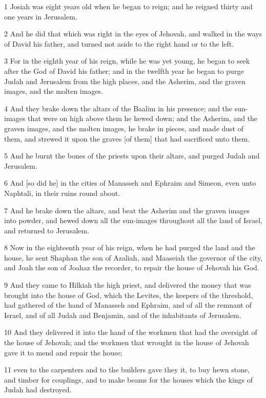 \par 1 Josiah was eight years old when he began to reign; and he reigned thirty and one years in Jerusalem.
\par 2 And he did that which was right in the eyes of Jehovah, and walked in the ways of David his father, and turned not aside to the right hand or to the left.
\par 3 For in the eighth year of his reign, while he was yet young, he began to seek after the God of David his father; and in the twelfth year he began to purge Judah and Jerusalem from the high places, and the Asherim, and the graven images, and the molten images.
\par 4 And they brake down the altars of the Baalim in his presence; and the sun-images that were on high above them he hewed down; and the Asherim, and the graven images, and the molten images, he brake in pieces, and made dust of them, and strewed it upon the graves [of them] that had sacrificed unto them.
\par 5 And he burnt the bones of the priests upon their altars, and purged Judah and Jerusalem.
\par 6 And [so did he] in the cities of Manasseh and Ephraim and Simeon, even unto Naphtali, in their ruins round about.
\par 7 And he brake down the altars, and beat the Asherim and the graven images into powder, and hewed down all the sun-images throughout all the land of Israel, and returned to Jerusalem.
\par 8 Now in the eighteenth year of his reign, when he had purged the land and the house, he sent Shaphan the son of Azaliah, and Maaseiah the governor of the city, and Joah the son of Joahaz the recorder, to repair the house of Jehovah his God.
\par 9 And they came to Hilkiah the high priest, and delivered the money that was brought into the house of God, which the Levites, the keepers of the threshold, had gathered of the hand of Manasseh and Ephraim, and of all the remnant of Israel, and of all Judah and Benjamin, and of the inhabitants of Jerusalem.
\par 10 And they delivered it into the hand of the workmen that had the oversight of the house of Jehovah; and the workmen that wrought in the house of Jehovah gave it to mend and repair the house;
\par 11 even to the carpenters and to the builders gave they it, to buy hewn stone, and timber for couplings, and to make beams for the houses which the kings of Judah had destroyed.
